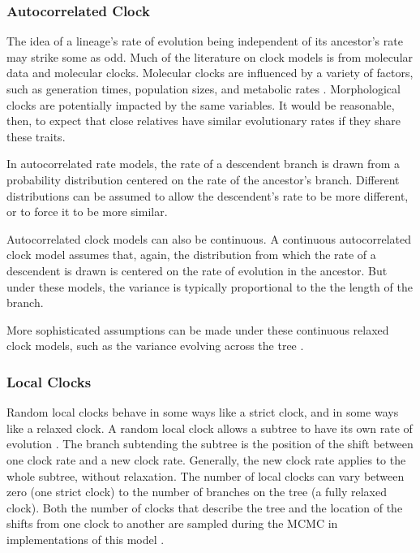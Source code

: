\subsubsection{Autocorrelated Clock}
The idea of %
a lineage's rate of evolution being independent of its ancestor's rate may strike some as odd. 
Much of the literature on clock models is from molecular data and molecular clocks.
Molecular clocks are influenced by a variety of factors, such as generation times, population sizes, and metabolic rates \citep{bromham1996, gaut1992}.
Morphological clocks are potentially impacted by the same variables. %
It would be reasonable, then, to expect that close relatives have similar evolutionary rates if they share these traits.

In autocorrelated rate models, the rate of a descendent branch is drawn from a probability distribution \citep{Aris-Brosou2002} centered on the rate of the ancestor's branch. 
Different distributions can be assumed to allow the descendent's rate to be more different, or to force it to be more similar. 


Autocorrelated clock models can also be continuous.
A continuous autocorrelated clock model assumes that, again, the distribution from which the rate of a descendent is drawn is centered on the rate of evolution in the ancestor.
But under these models, the variance is typically proportional to the the length of the branch.

More sophisticated assumptions can be made under these continuous relaxed clock models, such as the variance evolving across the tree \citep{Thorne1998, Kishino2001, Thorne2002, Aris-Brosou2002, Aris-Brosou2003}.

\subsubsection{Local Clocks}

Random local clocks behave in some ways like a strict clock, and in some ways like a relaxed clock. 
A random local clock allows a subtree to have its own rate of evolution \citep{yoder2000}. 
The branch subtending the subtree is the position of the shift between one clock rate and a new clock rate. 
Generally, the new clock rate applies to the whole subtree, without relaxation.
The number of local clocks can vary between zero (one strict clock) to the number of branches on the tree (a fully relaxed clock).
Both the number of clocks that describe the tree and the location of the shifts from one clock to another are sampled during the MCMC in implementations of this model \citep{Drummond2010}. 


